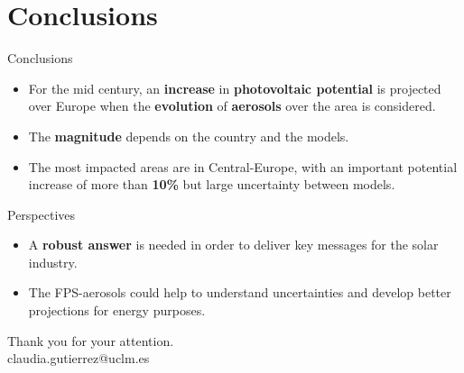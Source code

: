 \documentclass{beamer}%
\begin{document}
\section{Conclusions}

\begin{frame}[fragile]{Conclusions}
\begin{alertblock}{}
    \begin{itemize}
    \item  For the mid century, an \textbf{\alert{increase}} in \textbf{photovoltaic potential} is projected over Europe when the \textbf{evolution} of \textbf{aerosols} over the area is considered.
    \item The \textbf{magnitude} depends on the country and the models.
    \item The most impacted areas are in Central-Europe, with an important potential increase of more than \textbf{10\%} but large uncertainty between models.
    \end{itemize}
\end{alertblock}
\begin{alertblock}{Perspectives}
\begin{itemize}
\item A \textbf{robust answer} is needed in order to deliver key messages for the solar industry.
\item The FPS-aerosols could help to understand uncertainties and develop better projections for energy purposes.  
\end{itemize}
\end{alertblock}
\end{frame}


\begin{frame}[standout]
    Thank you for your attention.\\ 
\vspace{2\baselineskip}\small{claudia.gutierrez@uclm.es}
\end{frame}
\end{document}
